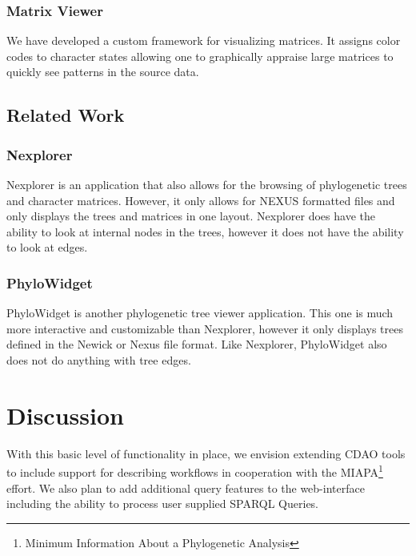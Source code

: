 \documentclass[10pt]{bmc_article}
\newenvironment{bmcformat}{\begin{raggedright}\baselineskip20pt\sloppy\setboolean{publ}{false}}{\end{raggedright}\baselineskip20pt\sloppy}
\begin{document}
\begin{bmcformat}
\subsubsection*{Matrix Viewer}
 We have developed  a custom framework for visualizing matrices. It assigns color codes to character states allowing one to graphically appraise large matrices to quickly see patterns in the source data.
  
\subsection*{Related Work}
\subsubsection*{Nexplorer}
Nexplorer is an application that also allows for the browsing of phylogenetic trees and character matrices.  However, it only allows for NEXUS formatted files and only displays the trees and matrices in one layout.  Nexplorer does have the ability to look at internal nodes in the trees, however it does not have the ability to look at edges.
\subsubsection*{PhyloWidget}
PhyloWidget is another phylogenetic tree viewer application.  This one is much more interactive and customizable than Nexplorer, however it only displays trees defined in the Newick or Nexus file format.  Like Nexplorer, PhyloWidget also does not do anything with tree edges.

\section*{Discussion}

  With this basic level of functionality in place, we envision extending CDAO tools to include support for describing
  workflows in cooperation with the MIAPA\footnote{Minimum Information About a Phylogenetic Analysis} effort.
  We also plan to add additional query features to the web-interface including the ability to process user supplied
  SPARQL Queries.
  

\end{bmcformat}
\end{document}
